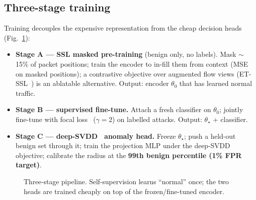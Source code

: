 \documentclass[11pt,a4paper]{article}
\newcommand{\hd}[1]{\textbf{\textcolor{accent}{#1}}}
\begin{document}
\subsection{Three-stage training}
Training decouples the expensive representation from the cheap decision heads
(Fig.~\ref{fig:pipe}):
\begin{itemize}[leftmargin=1.4em,itemsep=1pt,topsep=2pt]
\item \hd{Stage A --- SSL masked pre-training} (benign only, no labels). Mask
$\sim$15\% of packet positions; train the encoder to in-fill them from context
(MSE on masked positions); a contrastive objective over augmented flow views
(ET-SSL~\cite{etssl}) is an ablatable alternative. Output: encoder $\theta_0$ that has learned normal traffic.
\item \hd{Stage B --- supervised fine-tune.} Attach a fresh classifier on
$\theta_0$; jointly fine-tune with focal loss~\cite{focal} ($\gamma\!=\!2$) on labelled
attacks. Output: $\theta_\star$ + classifier.
\item \hd{Stage C --- deep-SVDD~\cite{deepsvdd} anomaly head.} Freeze $\theta_\star$; push a
held-out benign set through it; train the projection MLP under the deep-SVDD
objective; calibrate the radius at the \textbf{99th benign percentile (1\% FPR
target)}.
\end{itemize}

\begin{figure}[H]
\centering
{}
\caption{Three-stage pipeline. Self-supervision learns ``normal'' once; the two
heads are trained cheaply on top of the frozen/fine-tuned encoder.}
\label{fig:pipe}
\end{figure}
\end{document}
